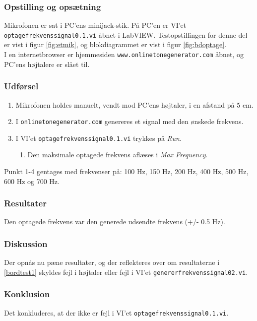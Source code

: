 		\subsubsection{Opstilling og opsætning}
		Mikrofonen er sat i PC'ens minijack-stik. På PC'en er VI'et \texttt{optagefrekvenssignal0.1.vi} åbnet i LabVIEW. Testopstillingen for denne del er vist i figur \ref{fig:etmik}, og blokdiagrammet er vist i figur \ref{fig:bdoptage}.\\ 
		I en internetbrowser er hjemmesiden \texttt{www.onlinetonegenerator.com} åbnet, og PC'ens højtalere er slået til. 
		
		\subsubsection{Udførsel}
			\begin{enumerate}
				\item Mikrofonen holdes manuelt, vendt mod PC'ens højtaler, i en afstand på 5 cm. 
				\item I \texttt{onlinetonegenerator.com} genereres et signal med den ønskede frekvens. 
				\item I VI'et \texttt{optagefrekvenssignal0.1.vi} trykkes på \textit{Run}. 
					\begin{enumerate}
						\item Den maksimale optagede frekvens aflæses i \textit{Max Frequency}. 
					\end{enumerate}	  
			\end{enumerate}
			
			Punkt 1-4 gentages med frekvenser på: 100 Hz, 150 Hz, 200 Hz, 400 Hz, 500 Hz, 600 Hz og 700 Hz. 
			
			\subsubsection{Resultater}
			Den optagede frekvens var den generede udsendte frekvens (+/- 0.5 Hz). 
			\subsubsection{Diskussion}
			Der opnås nu pæne resultater, og der reflekteres over om resultaterne i \ref{bordtest1} skyldes fejl i højtaler eller fejl i VI'et \texttt{genererfrekvenssignal02.vi}. 
			\subsubsection{Konklusion}
			Det konkluderes, at der ikke er fejl i VI'et \texttt{optagefrekvenssignal0.1.vi}. 
